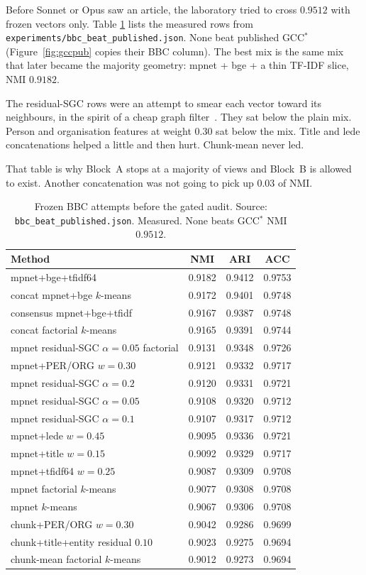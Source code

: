 \documentclass[11pt,a4paper]{article}
\begin{document}
Before Sonnet or Opus saw an article, the laboratory tried to
cross $0.9512$ with frozen vectors only. Table
\ref{tab:frozen} lists the measured rows from
\texttt{experiments/bbc\_beat\_published.json}. None beat
published GCC$^*$ (Figure~\ref{fig:gccpub} copies their BBC
column). The best mix is the same mix that later
became the majority geometry: mpnet + bge + a thin TF-IDF
slice, NMI $0.9182$.

The residual-SGC rows were an attempt to smear each vector
toward its neighbours, in the spirit of a cheap graph
filter~\cite{kipf2017gcn}. They sat below the plain mix.
Person and organisation features at weight $0.30$ sat below
the mix. Title and lede concatenations helped a little and
then hurt. Chunk-mean never led.

That table is why Block~A stops at a majority of views and
Block~B is allowed to exist. Another concatenation was not
going to pick up $0.03$ of NMI.

\begin{table}[t]
\centering
\caption{Frozen BBC attempts before the gated audit. Source:
\texttt{bbc\_beat\_published.json}. Measured. None beats
GCC$^*$ NMI $0.9512$.}
\label{tab:frozen}
\small
\begin{tabular}{lccc}
\toprule
Method & NMI & ARI & ACC \\
\midrule
mpnet+bge+tfidf64 & 0.9182 & 0.9412 & 0.9753 \\
concat mpnet+bge $k$-means & 0.9172 & 0.9401 & 0.9748 \\
consensus mpnet+bge+tfidf & 0.9167 & 0.9387 & 0.9748 \\
concat factorial $k$-means & 0.9165 & 0.9391 & 0.9744 \\
mpnet residual-SGC $\alpha=0.05$ factorial & 0.9131 & 0.9348 & 0.9726 \\
mpnet+PER/ORG $w=0.30$ & 0.9121 & 0.9332 & 0.9717 \\
mpnet residual-SGC $\alpha=0.2$ & 0.9120 & 0.9331 & 0.9721 \\
mpnet residual-SGC $\alpha=0.05$ & 0.9108 & 0.9320 & 0.9712 \\
mpnet residual-SGC $\alpha=0.1$ & 0.9107 & 0.9317 & 0.9712 \\
mpnet+lede $w=0.45$ & 0.9095 & 0.9336 & 0.9721 \\
mpnet+title $w=0.15$ & 0.9092 & 0.9329 & 0.9717 \\
mpnet+tfidf64 $w=0.25$ & 0.9087 & 0.9309 & 0.9708 \\
mpnet factorial $k$-means & 0.9077 & 0.9308 & 0.9708 \\
mpnet $k$-means & 0.9067 & 0.9306 & 0.9708 \\
chunk+PER/ORG $w=0.30$ & 0.9042 & 0.9286 & 0.9699 \\
chunk+title+entity residual $0.10$ & 0.9023 & 0.9275 & 0.9694 \\
chunk-mean factorial $k$-means & 0.9012 & 0.9273 & 0.9694 \\
\bottomrule
\end{tabular}
\end{table}
\end{document}

